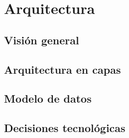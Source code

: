 \chapter{Arquitectura}
\label{cap:arquitectura}

\section{Visión general}

\section{Arquitectura en capas}

\section{Modelo de datos}

\section{Decisiones tecnológicas}
